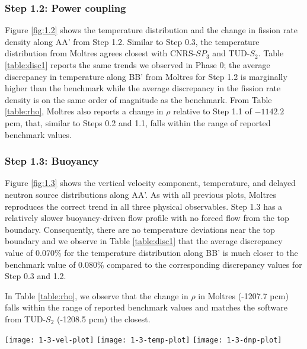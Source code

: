 \FloatBarrier

\subsubsection{Step 1.2: Power coupling}

Figure \ref{fig:1.2} shows the temperature distribution and the change in
fission rate density along AA' from Step 1.2. Similar to Step 0.3, the
temperature distribution from Moltres agrees closest with CNRS-$SP_3$ and
TUD-$S_2$. Table \ref{table:disc1} reports the same trends we observed in Phase
0; the average discrepancy in temperature along BB' from Moltres for Step 1.2
is marginally higher than the benchmark while the average discrepancy in the
fission rate density is on the same order of magnitude as the benchmark.
From Table \ref{table:rho}, Moltres also reports a change in $\rho$
relative to Step 1.1 of $-1142.2$ pcm, that, similar to Steps 0.2 and 1.1,
falls within the range of reported benchmark values.

\subsubsection{Step 1.3: Buoyancy}

Figure \ref{fig:1.3} shows the vertical velocity component, temperature, and
delayed neutron source distributions along AA'. As with all previous plots,
Moltres reproduces the correct trend in all three physical
observables. Step 1.3 has a relatively slower buoyancy-driven flow profile with
no forced flow from the top boundary. Consequently, there are no temperature
deviations near the top boundary and we observe in Table \ref{table:disc1} that
the average discrepancy value of 0.070\% for the temperature distribution along
BB' is much closer to the benchmark value of 0.080\% compared to the
corresponding discrepancy values for Step 0.3 and 1.2.

In Table \ref{table:rho}, we observe that the change in $\rho$ in
Moltres (-1207.7 pcm) falls within the range of reported benchmark values and
matches the software from TUD-$S_2$ (-1208.5 pcm) the closest.
%
\begin{figure*}[htb]
	\centering
	\texttt{[image: 1-3-vel-plot]}
	\texttt{[image: 1-3-temp-plot]}
	\texttt{[image: 1-3-dnp-plot]}
	\caption{Step 1.3 - Vertical velocity component, temperature distribution,
	and delayed neutron source along AA'.}
	\label{fig:1.3}
\end{figure*}

